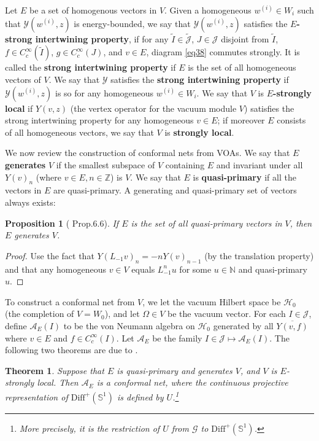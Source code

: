 \documentclass[12pt,a4paper]{article}
\theoremstyle{definition}
\theoremstyle{plain}
\newtheorem{thm}[df]{Theorem}
\newtheorem{pp}[df]{Proposition}
\newcommand{\mc}{\mathcal}
\newcommand{\wtd}{\widetilde}
\newcommand{\ovl}{\overline}
\newcommand{\Diffp}{\mathrm{Diff}^+}
\newcommand{\scr}{\mathscr}
\newcommand{\Jtd}{\widetilde{\mathcal J}}
\newcommand{\mbb}{\mathbb}
\numberwithin{equation}{subsection}
\begin{document}
Let $E$ be a set of homogenous vectors in $V$. Given a homogeneous $w^{(i)}\in W_i$ such that $\mc Y(w^{(i)},z)$ is energy-bounded, we say that $\mc Y(w^{(i)},z)$ satisfies the \textbf{$E$-strong intertwining property}, if for any $\wtd I\in\Jtd$, $J\in\mc J$ disjoint from $\wtd I$, $f\in C_c^\infty(\wtd I)$, $g\in C_c^\infty(J)$, and  $v\in E$, diagram \ref{eq38} commutes strongly. It is called the  \textbf{strong intertwining property} if $E$ is the set of all homogeneous vectors of $V$. We say that $\mc Y$ satisfies the \textbf{strong intertwining property} if $\mc Y(w^{(i)},z)$ is so for any homogeneous $w^{(i)}\in W_i$. We say that $V$ is \textbf{$E$-strongly local} \cite{CKLW18} if  $Y(v,z)$ (the vertex operator for the vacuum module $V$) satisfies the strong intertwining property for any homogeneous $v\in E$; if moreover $E$ consists of all homogeneous vectors, we say that $V$ is \textbf{strongly local}.

We now review the construction of conformal nets from VOAs. We say that $E$ \textbf{generates} $V$ if the smallest subspace of $V$ containing $E$ and invariant under all $Y(v)_n$ (where $v\in E,n\in\mbb Z$) is $V$. We say that $E$ is \textbf{quasi-primary} if all the vectors in $E$ are quasi-primary. A generating and quasi-primary set of vectors always exists:

\begin{pp}[\cite{CKLW18} Prop.6.6]\label{lb56}
If $E$ is the set of all quasi-primary vectors in $V$, then $E$ generates $V$.
\end{pp}
\begin{proof}
Use the fact that $Y(L_{-1}v)_n=-nY(v)_{n-1}$ (by the translation property) and that any homogeneous $v\in V$ equals $L_{-1}^nu$ for some $u\in\mbb N$ and quasi-primary $u$.
\end{proof}



To construct a conformal net from $V$, we   let the vacuum Hilbert space be $\mc H_0$ (the completion of $V=W_0$), and let $\Omega\in V$ be the vacuum vector. For each $I\in\mc J$, define $\mc A_E(I)$ to be the von Neumann algebra on $\mc H_0$ generated by all $\ovl{Y(v,f)}$ where $v\in E$ and $f\in C_c^\infty(I)$. Let $\mc A_E$ be the family $I\in\mc J\mapsto \mc A_E(I)$. The following two theorems are due to \cite{CKLW18}.

\begin{thm}
Suppose that $E$ is quasi-primary and generates $V$, and $V$ is $E$-strongly local. Then $\mc A_E$ is a conformal net, where the continuous projective representation of $\Diffp(\mbb S^1)$ is defined by $U$.\footnote{More precisely, it is the restriction of $U$ from $\scr G$ to $\Diffp(\mbb S^1)$.}
\end{thm}
\end{document}
